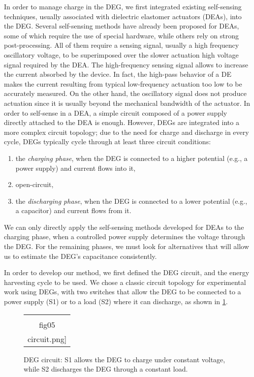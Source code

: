 In order to manage charge in the DEG, we first integrated existing self-sensing techniques, usually associated with dielectric elastomer actuators (DEAs), into the DEG. Several self-sensing methods have already been proposed for DEAs\cite{RN702}, some of which require the use of special hardware\cite{hoffstadtSS}, while others rely on strong post-processing\cite{GisbySS}. All of them require a sensing signal, usually a high frequency oscillatory voltage, to be superimposed over the slower actuation high voltage signal required by the DEA. The high-frequency sensing signal allows to increase the current absorbed by the device. In fact, the high-pass behavior of a DE makes the current resulting from typical low-frequency actuation too low to be accurately measured. On the other hand, the oscillatory signal does not produce actuation since it is usually beyond the mechanical bandwidth of the actuator. In order to  self-sense in a DEA, a simple circuit composed of a power supply directly attached to the DEA is enough. However, DEGs are integrated into a more complex circuit topology; due to the need for charge and discharge in every cycle, DEGs typically cycle through at least three circuit conditions:
\begin{enumerate}
\item the \emph{charging phase}, when the DEG is connected to a higher potential (e.g., a power supply) and current flows into it,
\item open-circuit, 
\item the \emph{discharging phase}, when the DEG is connected to a lower potential (e.g., a capacitor)  and current flows from it.
\end{enumerate}
We can only directly apply the self-sensing methods developed for DEAs to the charging phase, when a controlled power supply determines the voltage through the DEG. For the remaining phases, we must look for alternatives that will allow us to estimate the DEG's capacitance consistently.

In order to develop our method, we first defined the DEG circuit, and the energy harvesting cycle to be used. We chose a classic circuit topology for experimental work using DEGs, with two switches that allow the DEG to be connected to a power supply (S1) or to a load (S2) where it can discharge, as shown in \ref{fig:circuit}.
   \begin{figure}[htb]
   \begin{center}
   \begin{tabular}{c} %
   \texttt{[image: \\fig05\\circuit.png]}
   \end{tabular}
   \end{center}
   \caption[example] 
   { \label{fig:circuit} 
DEG circuit: S1 allows the DEG to charge under constant voltage, while S2 discharges the DEG through a constant load.}
   \end{figure} 

